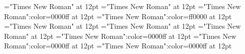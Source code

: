 \documentclass[a4paper]{article}
\begin{document}
\pagestyle{plain}
\sloppy
\setlength{\parfillskip}{0pt plus 1fil}
\font\sectionletter="Times New Roman" at 12pt
\font\articlesectionletter="Times New Roman" at 12pt
\font\sensearticlesectionletter="Times New Roman":color=0000ff at 12pt
\font\sensebeforearticlesectionletter="Times New Roman":color=ff0000 at 12pt
\font\firstoftypeheadwordlastoftypesectionletter="Times New Roman" at 12pt
\font\firstoftypelastoftypepronunciationarticlesectionletter="Times New Roman" at 12pt
\font\firstoftypelastoftypestressfirstoftypelastoftypepronunciationarticlesectionletter="Times New Roman" at 12pt
\font\firstoftypegrammarcategorylastoftypesensearticlesectionletter="Times New Roman":color=0000ff at 12pt
\font\exampleusefirstoftypelastoftypesensearticlesectionletter="Times New Roman":color=0000ff at 12pt
\font\examplesensearticlesectionletter="Times New Roman":color=0000ff at 12pt

\newpage 
\thispagestyle{empty} 
\mbox{} 
\newpage 
\newpage 
\setcounter{page}{1} 
\pagestyle{fancy} 

\end{document}

